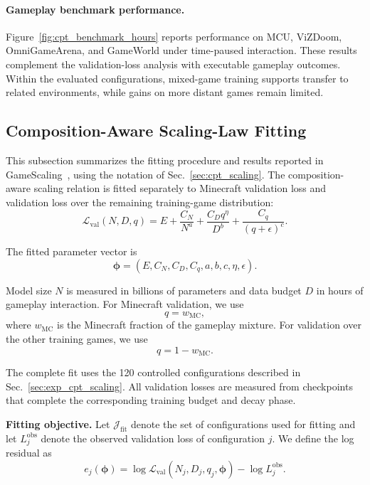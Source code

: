 \paragraph{Gameplay benchmark performance.}
Figure~\ref{fig:cpt_benchmark_hours} reports performance on MCU, ViZDoom, OmniGameArena, and GameWorld under time-paused interaction. These results complement the validation-loss analysis with executable gameplay outcomes. Within the evaluated configurations, mixed-game training supports transfer to related environments, while gains on more distant games remain limited.

\subsection{Composition-Aware Scaling-Law Fitting}
\label{app:cpt_scaling_fit}

This subsection summarizes the fitting procedure and results reported in GameScaling~\cite{gamescaling}, using the notation of Sec.~\ref{sec:cpt_scaling}.
The composition-aware scaling relation is fitted separately to Minecraft validation loss and validation loss over the remaining training-game distribution:
\begin{equation}
\mathcal{L}_{\mathrm{val}}(N,D,q)
=
E
+
\frac{C_N}{N^a}
+
\frac{C_D q^\eta}{D^b}
+
\frac{C_q}{(q+\epsilon)^c}.
\label{eq:appendix_scaling_law}
\end{equation}

The fitted parameter vector is
\[
\boldsymbol{\phi}
=
\left(
E,
C_N,
C_D,
C_q,
a,
b,
c,
\eta,
\epsilon
\right).
\]

Model size $N$ is measured in billions of parameters and data budget $D$ in hours of gameplay interaction.
For Minecraft validation, we use
\[
q=w_{\mathrm{MC}},
\]
where $w_{\mathrm{MC}}$ is the Minecraft fraction of the gameplay mixture.
For validation over the other training games, we use
\[
q=1-w_{\mathrm{MC}}.
\]

The complete fit uses the 120 controlled configurations described in Sec.~\ref{sec:exp_cpt_scaling}.
All validation losses are measured from checkpoints that complete the corresponding training budget and decay phase.

\textbf{Fitting objective.}
Let $\mathcal J_{\mathrm{fit}}$ denote the set of configurations used for fitting and let $L_j^{\mathrm{obs}}$ denote the observed validation loss of configuration $j$.
We define the log residual as
\[
e_j(\boldsymbol{\phi})
=
\log
\mathcal{L}_{\mathrm{val}}
\left(
N_j,D_j,q_j,
\boldsymbol{\phi}
\right)
-
\log
L_j^{\mathrm{obs}}.
\]

